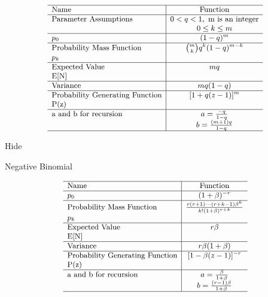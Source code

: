 \documentclass[]{book}
\begin{document}
\[
{\small
\begin{matrix}
\begin{array}{l|c}
\hline
  \text{Name} & \text{Function} \\
\hline
  \text{Parameter Assumptions} & 0<q<1,~\text{m is an integer} \\
   & 0 \leq k \leq m\\
\hline
  p_0 &(1-q)^m \\
\hline
  \text{Probability Mass Function} & \binom{m}{k}q^k(1-q)^{m-k} \\
  p_k & \\
\hline
  \text{Expected Value} & mq \\
  \mathrm{E[N]} & \\
\hline
  \text{Variance} & mq(1-q) \\
\hline
  \text{Probability Generating Function} & [1+q(z-1)]^m \\
  \mathrm{P(z)} & \\
  \hline
  \text{a and b for recursion} & a=\frac{-q}{1-q} \\
   & b=\frac{(m+1)q}{1-q} \\
\hline
\end{array}
\end{matrix}
}
\]

\hypertarget{disD}{}
{Hide}

Negative Binomial

\[
{\small
\begin{matrix}
\begin{array}{l|c}
\hline
  \text{Name} & \text{Function} \\
\hline
  p_0 & (1+\beta)^{-r} \\
\hline
  \text{Probability Mass Function} & \frac{r(r+1)\cdots(r+k-1)\beta^k}{k!(1+\beta)^{r+k}} \\
  p_k & \\
\hline
  \text{Expected Value} & r\beta \\
  \mathrm{E[N]} & \\
\hline
  \text{Variance} & r\beta(1+\beta) \\
\hline
  \text{Probability Generating Function} & [1-\beta(z-1)]^{-r} \\
  \mathrm{P(z)} & \\
  \hline
  \text{a and b for recursion} & a=\frac{\beta}{1+\beta} \\
   & b=\frac{(r-1)\beta}{1+\beta} \\
\hline
\end{array}
\end{matrix}
}
\]
\end{document}
